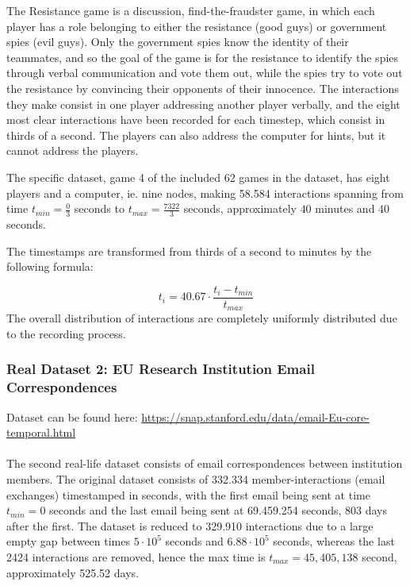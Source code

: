 The Resistance game is a discussion, find-the-fraudster game, in which each player has a role belonging to either the resistance (good guys) or government spies (evil guys).
Only the government spies know the identity of their teammates, and so the goal of the game is for the resistance to identify the spies through verbal communication and vote them out, while the spies try to vote out the resistance by convincing their opponents of their innocence. 
The interactions they make consist in one player addressing another player verbally, and the eight most clear interactions have been recorded for each timestep, which consist in thirds of a second. 
The players can also address the computer for hints, but it cannot address the players.

The specific dataset, game 4 of the included 62 games in the dataset, has eight players and a computer, ie. nine nodes, making 58.584 interactions spanning from time $t_{min} = \frac{0}{3}$ seconds to $t_{max} = \frac{7322}{3}$ seconds, approximately $40$ minutes and $40$ seconds.

The timestamps are transformed from thirds of a second to minutes by the following formula:

\begin{equation}
    t_i = 40.67 \cdot \frac{t_i - t_{min}}{t_{max}}
\end{equation}
The overall distribution of interactions are completely uniformly distributed due to the recording process.



\subsubsection{Real Dataset 2: EU Research Institution Email Correspondences}
\label{sec:Data:RealData:RealDataset2}
Dataset can be found here: \href{https://snap.stanford.edu/data/email-Eu-core-temporal.html}{https://snap.stanford.edu/data/email-Eu-core-temporal.html}
\\\\
The second real-life dataset consists of email correspondences between institution members.
The original dataset consists of 332.334 member-interactions (email exchanges) timestamped in seconds, with the first email being sent at time $t_{min} = 0$ seconds and the last email being sent at 69.459.254 seconds, 803 days after the first.
The dataset is reduced to 329.910 interactions due to a large empty gap between times $5 \cdot 10^5$ seconds and $6.88 \cdot 10^5$ seconds, whereas the last 2424 interactions are removed, hence the max time is $t_{max} = 45,405,138$ second, approximately 525.52 days.


